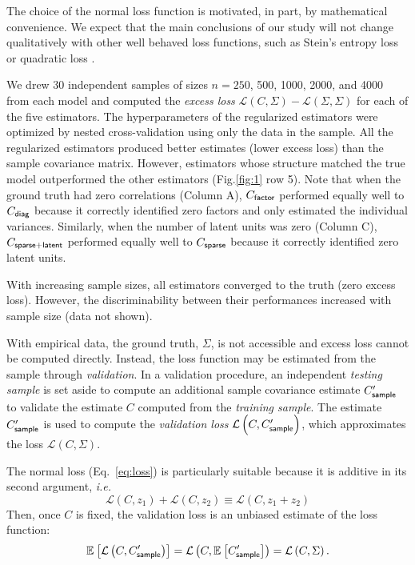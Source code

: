 \documentclass[10pt]{article}
\newcommand{\figref}[2]{Fig.\;\ref{fig:#1}\,#2}
\newcommand{\loss}[1]{\mathcal L\left(#1\right)}
\newcommand{\E}[2][]{\mathbb E_{#1}\left[ #2\right]}    %
\newcommand{\ie}{\emph{i.e.}\;}
\begin{document}
The choice of the normal loss function is motivated, in part, by mathematical convenience. We expect that the main conclusions of our study will not change qualitatively with other well behaved loss functions, such as Stein's entropy loss or quadratic loss \cite{James:1961, Fan:2008, Ledoit:2004, Schafer:2005}.  

We drew 30 independent samples of sizes $n=250$, 500, 1000, 2000, and 4000 from each model and computed the \emph{excess loss} $\loss{C,\Sigma}-\loss{\Sigma,\Sigma}$ for each of the five estimators.  The hyperparameters of the regularized estimators were optimized by nested cross-validation using only the data in the sample.  All the regularized estimators produced better estimates (lower excess loss) than the sample covariance matrix.  However, estimators whose structure matched the true model outperformed the other estimators (\figref{1}{\,row 5}).  Note that when the ground truth had zero correlations (Column A), $C_{\sf factor}$ performed equally well to $C_{\sf diag}$ because it correctly identified zero factors and only estimated the individual variances. Similarly, when the number of latent units was zero (Column C), $C_{\sf sparse+latent}$ performed equally well to $C_{\sf sparse}$ because it correctly identified zero latent units. 

With increasing sample sizes, all estimators converged to the truth (zero excess loss).  However, 
the discriminability between their performances increased with sample size (data not shown).

With empirical data, the ground truth, $\Sigma$, is not accessible and excess loss cannot be computed directly. Instead, the loss function may be estimated from the sample through \emph{validation}.  In a validation procedure, an independent \emph{testing sample} is set aside to compute an additional sample covariance estimate $C_{\sf sample}^\prime$ to validate the estimate $C$ computed from the  \emph{training sample}.   The estimate $C_{\sf sample}^\prime$ is used to compute the \emph{validation loss} $\loss{C,C_{\sf sample}^\prime}$, which approximates the loss  $\loss{C,\Sigma}$.

The normal loss (Eq.~\ref{eq:loss}) is particularly suitable because it is additive in its second argument, \ie
\begin{equation*}\label{eq:additivity}
    \loss{C,z_1} + \loss{C,z_2} \equiv \loss{C,z_1+z_2}
\end{equation*}
Then, once $C$ is fixed, the validation loss is an unbiased estimate of the loss function:
\begin{equation*}
    \E{\loss{C,C_{\sf sample}^\prime}}=\loss{C,\E{C_{\sf sample}^\prime}}=\loss{C,\Sigma}.
\end{equation*}
\end{document}
